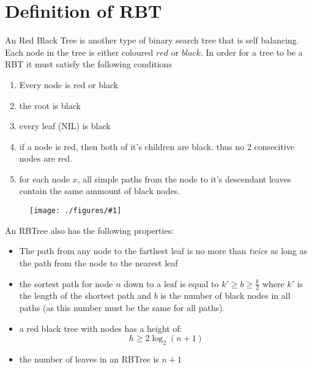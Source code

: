\documentclass[12pt]{book}
\title{\coursetitle\linebreak\lecturename}
\author{\\Cain Susko\\ 
           \\ \\ \\
      Queen's University 
    \\School of Computing\\}
\newcommand{\incimg}[2]{%
       \begin{figure}[h]
               \centering
               \texttt{[image: ./figures/\#1]}
       \end{figure}
}
\begin{document}
\begin{titlepage}
        \maketitle
\end{titlepage}


\section*{Definition of RBT}
An Red Black Tree is another type of binary search tree that is self balancing. Each node in the
tree is either coloured $red$ or $black$. In order for a tree to be a RBT it must satisfy the
following conditions
\begin{enumerate}
        \item Every node is red or black
        \item the root is black
        \item every leaf (NIL) is black
        \item if a node is red, then both of it's children are black. thus no 2 consecitive nodes
                are red.
        \item for each node $x$, all simple paths from the node to it's descendant leaves
                contain the same ammount of black nodes.
\end{enumerate}

\incimg{RBTex}{0.5}

An RBTree also has the following properties:
\begin{itemize}
        \item The path from any node to the farthest leaf is no more than \textit{twice} as long
                as the path from the node to the nearest leaf
        \item the sortest path for node $n$ down to a leaf is equal to $k'\geq b \geq \frac{k}{2}$
                where $k'$ is the length of the shortest path and $b$ is the number of 
                black nodes in all paths (as this number must be the same for all paths).
        \item a red black tree with nodes has a height of:
                \[h \geq 2\log_2 (n+1)\]
        \item the number of leaves in an RBTree is $n+1$
\end{itemize}
\end{document}
